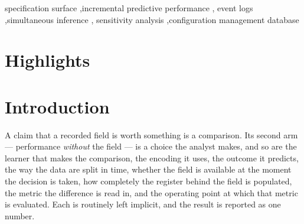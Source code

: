 \documentclass[preprint,12pt,authoryear]{elsarticle}
\theoremstyle{definition}
\begin{document}
\begin{frontmatter}
\begin{keyword}
specification surface \sep incremental predictive performance \sep
event logs \sep simultaneous inference \sep
sensitivity analysis \sep configuration management database
\end{keyword}

\end{frontmatter}

\section*{Highlights}
\begin{itemize}\itemsep0pt
\highlightsList{}
\end{itemize}

\section{Introduction}
\label{sec:intro}

A claim that a recorded field is worth something is a comparison. Its second
arm --- performance \emph{without} the field --- is a choice the analyst
makes, and so are the learner that makes the comparison, the encoding it uses,
the outcome it predicts, the way the data are split in time, whether the field
is available at the moment the decision is taken, how completely the register
behind the field is populated, the metric the difference is read in, and the
operating point at which that metric is evaluated. Each is routinely left
implicit, and the result is reported as one number.
\end{document}
